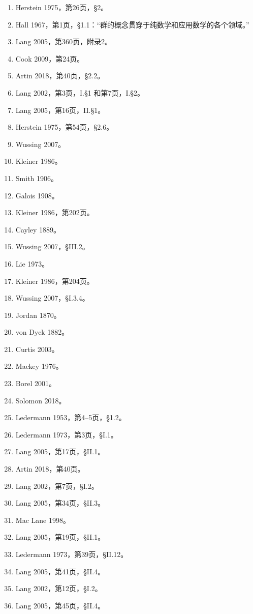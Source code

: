 \begin{enumerate}
\item Herstein 1975，第26页，§2。  
\item Hall 1967，第1页，§1.1：“群的概念贯穿于纯数学和应用数学的各个领域。”  
\item Lang 2005，第360页，附录2。  
\item Cook 2009，第24页。  
\item Artin 2018，第40页，§2.2。  
\item Lang 2002，第3页，I.§1 和第7页，I.§2。  
\item Lang 2005，第16页，II.§1。  
\item Herstein 1975，第54页，§2.6。  
\item Wussing 2007。  
\item Kleiner 1986。  
\item Smith 1906。  
\item Galois 1908。  
\item Kleiner 1986，第202页。  
\item Cayley 1889。  
\item Wussing 2007，§III.2。  
\item Lie 1973。  
\item Kleiner 1986，第204页。  
\item Wussing 2007，§I.3.4。  
\item Jordan 1870。  
\item von Dyck 1882。
\item Curtis 2003。  
\item Mackey 1976。  
\item Borel 2001。  
\item Solomon 2018。  
\item Ledermann 1953，第4–5页，§1.2。  
\item Ledermann 1973，第3页，§I.1。  
\item Lang 2005，第17页，§II.1。  
\item Artin 2018，第40页。  
\item Lang 2002，第7页，§I.2。  
\item Lang 2005，第34页，§II.3。  
\item Mac Lane 1998。  
\item Lang 2005，第19页，§II.1。  
\item Ledermann 1973，第39页，§II.12。  
\item Lang 2005，第41页，§II.4。  
\item Lang 2002，第12页，§I.2。  
\item Lang 2005，第45页，§II.4。  

\end{enumerate}
